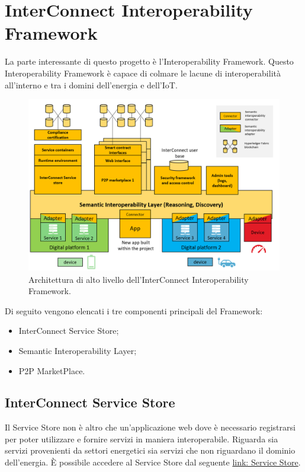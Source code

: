 \section{InterConnect Interoperability Framework}
La parte interessante di questo progetto è l'Interoperability Framework.
Questo Interoperability Framework è capace di colmare le lacune di interoperabilità all'interno e tra i domini dell'energia e dell'IoT.

\begin{figure}[H]
    \centering
    \includegraphics[width=\textwidth]{figures/architetturaFrameworkInterconnect.png}
    \caption{Architettura di alto livello dell'InterConnect Interoperability Framework.}
    \label{fig:architetturaFrameworkInterconnect}
\end{figure}

Di seguito vengono elencati i tre componenti principali del Framework:
\begin{itemize}
    \item InterConnect Service Store;
    \item Semantic Interoperability Layer;
    \item P2P MarketPlace.
\end{itemize}

\subsection{InterConnect Service Store}

Il Service Store non è altro che un'applicazione web dove è necessario registrarsi per poter utilizzare e fornire servizi in maniera interoperabile. Riguarda sia servizi provenienti da settori energetici sia servizi che non riguardano il dominio dell'energia.
È possibile accedere al Service Store dal seguente \href{https://store.interconnectproject.eu/ServiceStore}{link: Service Store}.

